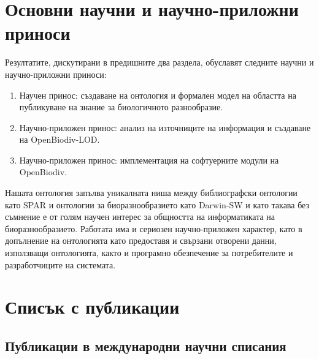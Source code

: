 \section*{Основни научни и научно-приложни приноси}

Резултатите, дискутирани в предишните два раздела, обуславят следните научни и научно-приложни приноси:

\begin{enumerate}
    \item Научен принос: създаване на онтология и формален модел на областта на публикуване на знание за биологичното разнообразие.
    \item Научно-приложен принос: анализ на източниците на информация и създаване на OpenBiodiv-LOD.
    \item Научно-приложен принос: имплементация на софтуерните модули на OpenBiodiv.
\end{enumerate}

Нашата онтология запълва уникалната ниша между библиографски онтологии като SPAR и онтологии за биоразнообразието като Darwin-SW и като такава без съмнение е от голям научен интерес за общността на информатиката на биоразнообразието. Работата има и сериозен научно-приложен характер, като в допълнение на онтологията като предоставя и свързани отворени данни, използващи онтологията, както и програмно обезпечение за потребителите и разработчиците на системата.

\section*{Списък с публикации}

\subsection*{Публикации в международни научни списания}

\begingroup
{}
\setcounter{count}{99}
%

